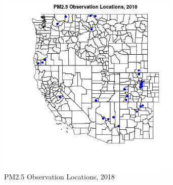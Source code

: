 \begin{figure} 
\centering  
\includegraphics[width=0.77\textwidth]{Code_Outputs/Report_PM25_Step4_part_e_de_duplicated_aves_ML_input_PlotLoc2018.jpg} 
\caption{\label{fig:Report_PM25_Step4_part_e_de_duplicated_aves_ML_inputPlotLoc2018}PM2.5 Observation Locations, 2018} 
\end{figure} 
 
